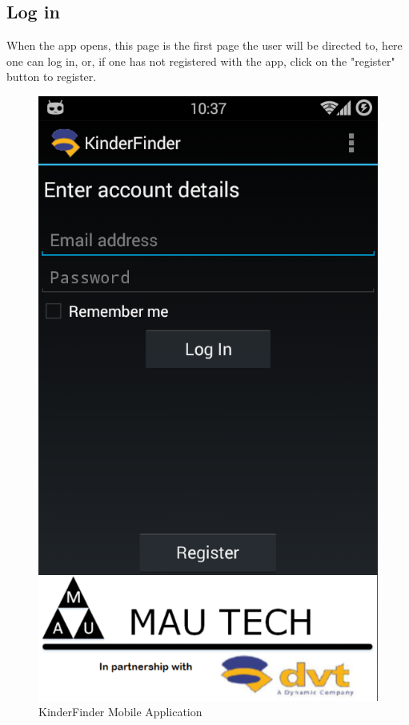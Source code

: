\documentclass{article}
\begin{document}
\subsection{Log in}
When the app opens, this page is the first page the user will be directed to, here one can log in, or, if one has not registered with the app, click on the "register" button to register.
\begin{figure}[H]
\centering
\includegraphics[scale=0.4]{Main App - Log In.png}
\caption{KinderFinder Mobile Application}
\end{figure}
\end{document}
